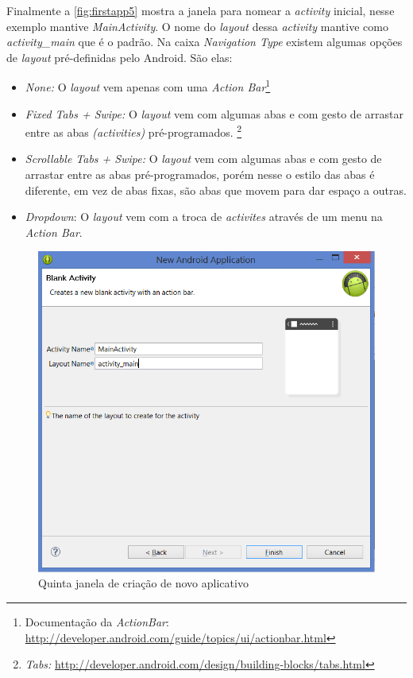 \documentclass[a4paper,12pt,brazil,oneside]{book}
\begin{document}
Finalmente a \autoref{fig:firstapp5} mostra a janela para nomear a \emph{activity} inicial, nesse exemplo mantive \emph{MainActivity}. O nome do \emph{layout} dessa \emph{activity} mantive como \emph{activity\_main} que é o padrão. Na caixa \emph{Navigation Type} existem algumas opções de \emph{layout} pré-definidas pelo Android. São elas:
\begin{itemize}
\item
	\emph{None:} O \emph{layout} vem apenas com uma \emph{Action Bar}\footnote{Documentação da \emph{ActionBar}: \href{http://developer.android.com/guide/topics/ui/actionbar.html}{http://developer.android.com/guide/topics/ui/actionbar.html}}
\item
	\emph{Fixed Tabs + Swipe:} O \emph{layout} vem com algumas abas e com gesto de arrastar entre as abas \emph{(activities)} pré-programados.
	\footnote{\emph{Tabs:} \href{http://developer.android.com/design/building-blocks/tabs.html}{http://developer.android.com/design/building-blocks/tabs.html}}
\item
	\emph{Scrollable Tabs + Swipe:} O \emph{layout} vem com algumas abas e com gesto de arrastar entre as abas pré-programados, porém nesse o estilo das abas é diferente, em vez de abas fixas, são abas que movem para dar espaço a outras. 
\item
	\emph{Dropdown}: O \emph{layout} vem com a troca de \emph{activites} através de um menu na \emph{Action Bar}.  
\end{itemize}


\begin{figure}[H]
  \centering
  \includegraphics[width=.75\textwidth]{figuras/firstapp/firstapp5.png}
  \caption{Quinta janela de criação de novo aplicativo}
  \label{fig:firstapp5}
\end{figure}
\end{document}
